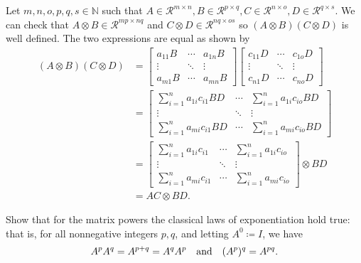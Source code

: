\begin{solution}
  Let $m,n,o,p,q,s \in \mathbb{N}$ such that
  $A \in \mathcal{R}^{m \times n}, B \in \mathcal{R}^{p \times q}, C \in \mathcal{R}^{n \times o}, D \in \mathcal{R}^{q \times s}$.
  We can check that
  $A \otimes B \in \mathcal{R}^{mp \times nq}$ and
  $C \otimes D \in \mathcal{R}^{nq \times os}$
  so $(A \otimes B) (C \otimes D)$ is well defined.
  The two expressions are equal as shown by
  \begin{align*}
    (A \otimes B) (C \otimes D)
    & =
    \begin{bmatrix}
      a_{11}B & \cdots & a_{1n}B\\
      \vdots  & \ddots & \vdots\\
      a_{m1}B & \cdots & a_{mn}B
    \end{bmatrix}
    \begin{bmatrix}
      c_{11}D & \cdots & c_{1o}D\\
      \vdots  & \ddots & \vdots\\
      c_{n1}D & \cdots & c_{no}D
    \end{bmatrix}\\
    & =
    \begin{bmatrix}
      \sum_{i=1}^n a_{1i}c_{i1}BD & \cdots & \sum_{i=1}^n a_{1i}c_{io}BD\\
      \vdots  & \ddots & \vdots\\
      \sum_{i=1}^n a_{mi}c_{i1}BD & \cdots & \sum_{i=1}^n a_{mi}c_{io}BD
    \end{bmatrix}\\
    & =
    \begin{bmatrix}
      \sum_{i=1}^n a_{1i}c_{i1} & \cdots & \sum_{i=1}^n a_{1i}c_{io}\\
      \vdots  & \ddots & \vdots\\
      \sum_{i=1}^n a_{mi}c_{i1} & \cdots & \sum_{i=1}^n a_{mi}c_{io}
    \end{bmatrix}
    \otimes BD\\
    & =
    AC \otimes BD.
  \end{align*}
\end{solution}

Show that for the matrix powers the classical laws of exponentiation hold true: that is, for all nonnegative integers \(p, q\), and letting \(A^0 \coloneqq I\), we have
\[
A^pA^q = A^{p+q} = A^qA^p \quad \textnormal{and} \quad (A^{p})^q = A^{pq}.
\]


